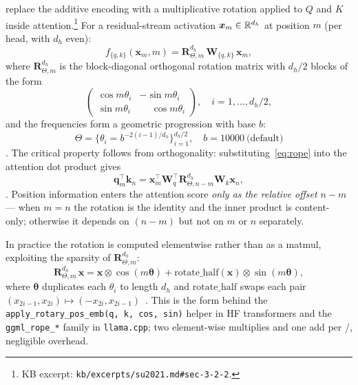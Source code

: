 \citet{su2021} replace the additive encoding with a multiplicative
rotation applied to $Q$ and $K$ inside attention.\footnote{KB excerpt:
\texttt{kb/excerpts/su2021.md\#sec-3-2-2}.} For a residual-stream
activation $\boldsymbol{x}_m \in \mathbb{R}^{d_h}$ at position $m$ (per head,
with $d_h$ even):
\begin{equation}
f_{\{q,k\}}(\boldsymbol{x}_m, m)
= \boldsymbol{R}^{d_h}_{\Theta, m}\, \boldsymbol{W}_{\{q,k\}}\, \boldsymbol{x}_m,
\label{eq:rope}
\end{equation}
where $\boldsymbol{R}^{d_h}_{\Theta, m}$ is the block-diagonal
orthogonal rotation matrix with $d_h/2$ blocks of the form
\begin{equation}
\begin{pmatrix}\cos m\theta_i & -\sin m\theta_i \\
               \sin m\theta_i & \phantom{-}\cos m\theta_i\end{pmatrix},
\quad i = 1, \ldots, d_h/2,
\label{eq:rope-block}
\end{equation}
and the frequencies form a geometric progression with base $b$:
\begin{equation}
\Theta = \bigl\{\theta_i = b^{-2(i-1)/d_h}\bigr\}_{i=1}^{d_h/2},
\quad b = 10000\ \text{(default)}
\label{eq:rope-theta}
\end{equation}
\citep[\S 3.2.2 Eq.\ 14--15]{su2021}. The critical property follows
from orthogonality: substituting~\eqref{eq:rope}
into the attention dot product gives
\begin{equation}
\boldsymbol{q}_m^\top \boldsymbol{k}_n
= \boldsymbol{x}_m^\top \boldsymbol{W}_q^\top
  \boldsymbol{R}^{d_h}_{\Theta, n - m} \boldsymbol{W}_k
  \boldsymbol{x}_n,
\label{eq:rope-relative}
\end{equation}
\citep[\S 3.2.2 Eq.\ 16]{su2021}. Position information enters the
attention score \emph{only as the relative offset $n-m$} --- when
$m = n$ the rotation is the identity and the inner product is content-
only; otherwise it depends on $(n-m)$ but not on $m$ or $n$ separately.

In practice the rotation is computed elementwise rather than as a
matmul, exploiting the sparsity of $\boldsymbol{R}^{d_h}_{\Theta, m}$:
\begin{equation}
\boldsymbol{R}^{d_h}_{\Theta, m}\, \boldsymbol{x}
= \boldsymbol{x} \otimes \cos(m\boldsymbol{\theta})
  + \mathrm{rotate\_half}(\boldsymbol{x}) \otimes \sin(m\boldsymbol{\theta}),
\label{eq:rope-pair}
\end{equation}
where $\boldsymbol{\theta}$ duplicates each $\theta_i$ to length $d_h$
and $\mathrm{rotate\_half}$ swaps each pair
$(x_{2i-1}, x_{2i}) \mapsto (-x_{2i}, x_{2i-1})$~\citep[\S 3.4.2 Eq.\ 34]{su2021}.
This is the form behind the
\texttt{apply\_rotary\_pos\_emb(q, k, cos, sin)} helper in HF
transformers and the \texttt{ggml\_rope\_*} family in \texttt{llama.cpp};
two element-wise multiplies and one add per /, negligible
overhead.

